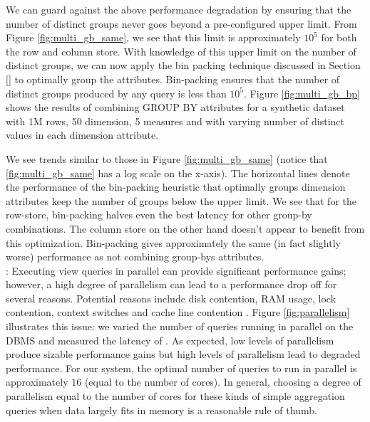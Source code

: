We can guard against the above performance degradation by ensuring that the
number of distinct groups never goes beyond a pre-configured upper limit.
From Figure \ref{fig:multi_gb_same}, we see that this limit is approximately
$10^5$ for both the row and column store.
With knowledge of this upper limit on the number of distinct groups, we can
now apply the bin packing technique discussed in Section \ref{} to optimally
group the attributes. 
Bin-packing ensures that the number of distinct groups produced by any
query is less than $10^5$. 
Figure \ref{fig:multi_gb_bp} shows the results of combining GROUP BY attributes
for a synthetic dataset with  1M rows, 50 dimension, 5 measures and with varying
number of distinct values in each dimension attribute.   

We see trends similar to those in Figure \ref{fig:multi_gb_same} (notice that
\ref{fig:multi_gb_same} has a log scale on the x-axis).
The horizontal lines denote the performance of the bin-packing heuristic that
optimally groups dimension attributes keep the number of groups below the
upper limit.
We see that for the row-store, bin-packing halves even the best latency for
other group-by combinations. 
The column store on the other hand doesn't appear to benefit from this
optimization.  
Bin-packing gives approximately the same (in fact slightly worse) performance as
not combining group-bys attributes. \\

: 
Executing view queries in parallel can provide significant performance gains;
however, a high degree of parallelism can lead to a performance drop off for
several reasons. Potential reasons include disk contention, RAM usage, lock
contention, context switches and cache line contention \cite{Postgres_wiki}. 
Figure \ref{fig:parallelism} illustrates this issue: we varied the number of
queries running in parallel on the DBMS and measured the latency of
\VizRecDB.
As expected, low levels of parallelism produce sizable performance gains but
high levels of parallelism lead to degraded performance.
For our system, the optimal number of queries to run in parallel is
approximately $16$ (equal to the number of cores). 
In general, choosing a degree of parallelism equal to the number of cores
for these kinds of simple aggregation queries when data largely fits in memory
is a reasonable rule of thumb.  

